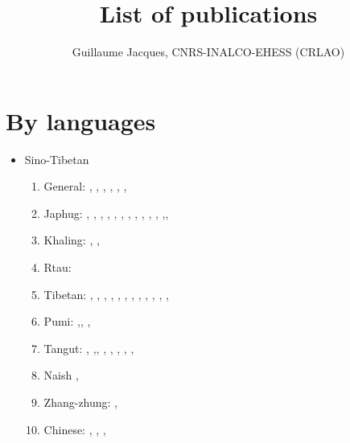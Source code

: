 \documentclass[oldfontcommands,oneside,a4paper,11pt]{article}
\begin{document}
 

  \title{List of publications}
 
\author{Guillaume Jacques, CNRS-INALCO-EHESS (CRLAO)}
\maketitle

 
\section{By languages}
\begin{itemize}
\item Sino-Tibetan
\begin{enumerate}
\item General: \citet{jacques03s.houzhui}, \citet{jacques06morpho}, \citet{jacques07chang}, \citet{antonov12kumush}, \citet{jacques12agreement},    \citet{michaud-jacques12nasalite},     
\item Japhug:  \citet{jacques04redupl},     \citet{jacques04these},   \citet{jacques07passif},  \citet{jacques07redupl}, \citet{jacques08},  \citet{jacques10gesar}, \citet{jacques10refl},  \citet{jacques10inverse},  \citet{jacques12incorp},   \citet{jacques12demotion},  \citet{jacques13harmonization},  \citet{jacques13tropative},\citet{jacques14antipassive}, \citet{japhug14ideophones}
\item Khaling: \citet{jacques12khaling},  \citet{jacques13derivational.khaling}, \citet{jacques14auditory}
\item Rtau: \citet{antonov14rtau}
\item Tibetan:  \citet{jacques01dg}, \citet{jacques04thimphu}, \citet{jacques07naksatram},      \citet{jacques08debther},  \citet{jacques09wazur}, \citet{jacques09e},  \citet{jacques10zos},   \citet{jacques10ndr},  \citet{jacques11lingua},  \citet{jacques12internal},  \citet{jacques12transcription}, \citet{jacques13yod}, \citet{jacques14snom}
\item Pumi:  \citet{michaud10bonin},\citet{jacques11pumi.tone}, \citet{jacques11lingua}, 
\item Tangut: \citet{jacques06comparaison},  \citet{jacques08weiyu},\citet{jacques08alternations},   \citet{jacques09tangutverb},  \citet{jacques10imperial},  \citet{jacques11tangut.verb}, \citet{jacques11ngwemi}, \citet{jacques11kinship}, 
\item Naish \citet{jacques.michaud11naish}, 
\item  Zhang-zhung: \citet{jacques09zz}, 
\item Chinese:  \citet{jacques00ywij},  \citet{jacques03dissimilation},   \citet{jacques2012genetic},

\end{enumerate}
\end{itemize}
\end{document}
